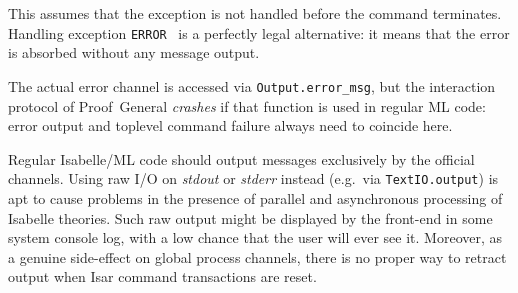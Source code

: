 \begin{isabellebody}
\begin{isamarkuptext}
\begin{description}
  This assumes that the exception is not handled before the command
  terminates.  Handling exception \verb|ERROR|~ is a
  perfectly legal alternative: it means that the error is absorbed
  without any message output.

  \begin{warn}
  The actual error channel is accessed via \verb|Output.error_msg|, but
  the interaction protocol of Proof~General \emph{crashes} if that
  function is used in regular ML code: error output and toplevel
  command failure always need to coincide here.
  \end{warn}

  \end{description}

  \begin{warn}
  Regular Isabelle/ML code should output messages exclusively by the
  official channels.  Using raw I/O on \emph{stdout} or \emph{stderr}
  instead (e.g.\ via \verb|TextIO.output|) is apt to cause problems in
  the presence of parallel and asynchronous processing of Isabelle
  theories.  Such raw output might be displayed by the front-end in
  some system console log, with a low chance that the user will ever
  see it.  Moreover, as a genuine side-effect on global process
  channels, there is no proper way to retract output when Isar command
  transactions are reset.
  \end{warn}


\end{isamarkuptext}
\end{isabellebody}
